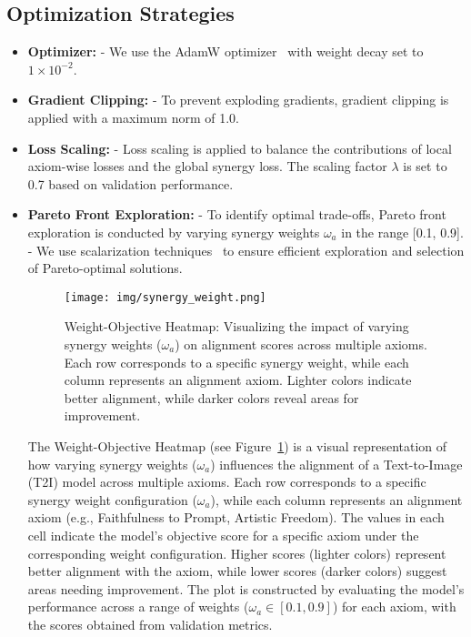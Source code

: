 \subsection{Optimization Strategies}
\begin{itemize}
    \item \textbf{Optimizer:}  
    - We use the AdamW optimizer~\cite{loshchilov2017decoupled} with weight decay set to \(1 \times 10^{-2}\).  

    \item \textbf{Gradient Clipping:}  
    - To prevent exploding gradients, gradient clipping is applied with a maximum norm of 1.0.  

    \item \textbf{Loss Scaling:}  
    - Loss scaling is applied to balance the contributions of local axiom-wise losses and the global synergy loss. The scaling factor \(\lambda\) is set to 0.7 based on validation performance.  

    \item \textbf{Pareto Front Exploration:}  
    - To identify optimal trade-offs, Pareto front exploration is conducted by varying synergy weights \(\omega_a\) in the range [0.1, 0.9].  
    - We use scalarization techniques~\cite{deb2001multi} to ensure efficient exploration and selection of Pareto-optimal solutions. 

    

    \begin{figure}[ht!]
    \centering
    \texttt{[image: img/synergy\_weight.png]}
    \caption{Weight-Objective Heatmap: Visualizing the impact of varying synergy weights (\(\omega_a\)) on alignment scores across multiple axioms. Each row corresponds to a specific synergy weight, while each column represents an alignment axiom. Lighter colors indicate better alignment, while darker colors reveal areas for improvement.}
    \label{fig:weight_objective_heatmap}
    \end{figure}

    The Weight-Objective Heatmap (see Figure~\ref{fig:weight_objective_heatmap}) is a visual representation of how varying synergy weights (\(\omega_a\)) influences the alignment of a Text-to-Image (T2I) model across multiple axioms. Each row corresponds to a specific synergy weight configuration (\(\omega_a\)), while each column represents an alignment axiom (e.g., Faithfulness to Prompt, Artistic Freedom). The values in each cell indicate the model's objective score for a specific axiom under the corresponding weight configuration. Higher scores (lighter colors) represent better alignment with the axiom, while lower scores (darker colors) suggest areas needing improvement. The plot is constructed by evaluating the model’s performance across a range of weights (\(\omega_a \in [0.1, 0.9]\)) for each axiom, with the scores obtained from validation metrics.


\end{itemize}
